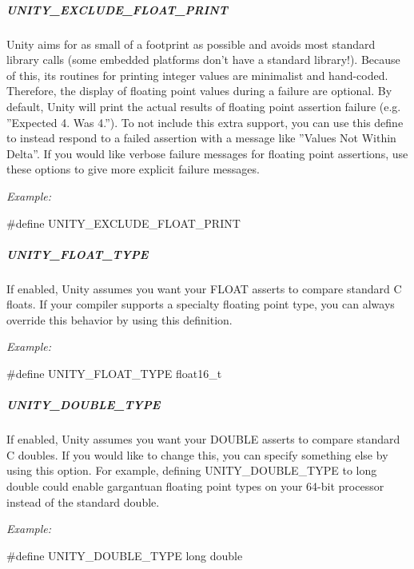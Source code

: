 \subparagraph*{{\ttfamily U\+N\+I\+T\+Y\+\_\+\+E\+X\+C\+L\+U\+D\+E\+\_\+\+F\+L\+O\+A\+T\+\_\+\+P\+R\+I\+NT}}

Unity aims for as small of a footprint as possible and avoids most standard library calls (some embedded platforms don’t have a standard library!). Because of this, its routines for printing integer values are minimalist and hand-\/coded. Therefore, the display of floating point values during a failure are optional. By default, Unity will print the actual results of floating point assertion failure (e.\+g. ”\+Expected 4. Was 4.”). To not include this extra support, you can use this define to instead respond to a failed assertion with a message like ”\+Values Not Within Delta”. If you would like verbose failure messages for floating point assertions, use these options to give more explicit failure messages.

{\itshape Example\+:} 
\begin{DoxyCode}
\textcolor{preprocessor}{#define UNITY\_EXCLUDE\_FLOAT\_PRINT}
\end{DoxyCode}


\subparagraph*{{\ttfamily U\+N\+I\+T\+Y\+\_\+\+F\+L\+O\+A\+T\+\_\+\+T\+Y\+PE}}

If enabled, Unity assumes you want your {\ttfamily F\+L\+O\+AT} asserts to compare standard C floats. If your compiler supports a specialty floating point type, you can always override this behavior by using this definition.

{\itshape Example\+:} 
\begin{DoxyCode}
\textcolor{preprocessor}{#define UNITY\_FLOAT\_TYPE float16\_t}
\end{DoxyCode}


\subparagraph*{{\ttfamily U\+N\+I\+T\+Y\+\_\+\+D\+O\+U\+B\+L\+E\+\_\+\+T\+Y\+PE}}

If enabled, Unity assumes you want your {\ttfamily D\+O\+U\+B\+LE} asserts to compare standard C doubles. If you would like to change this, you can specify something else by using this option. For example, defining {\ttfamily U\+N\+I\+T\+Y\+\_\+\+D\+O\+U\+B\+L\+E\+\_\+\+T\+Y\+PE} to {\ttfamily long double} could enable gargantuan floating point types on your 64-\/bit processor instead of the standard {\ttfamily double}.

{\itshape Example\+:} 
\begin{DoxyCode}
\textcolor{preprocessor}{#define UNITY\_DOUBLE\_TYPE long double}
\end{DoxyCode}


